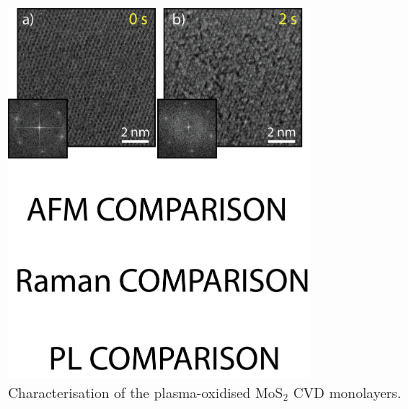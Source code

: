 \documentclass[%
 reprint,
superscriptaddress,
 amsmath,amssymb,
 aps,
prb,
]{revtex4-1}
\begin{document}
\begin{center}
\begin{figure}[!htb]
\includegraphics[width=80mm]{Figure_4_photo}
\caption{Characterisation of the plasma-oxidised MoS$_2$ CVD monolayers.}
\end{figure}
\end{center}
\end{document}
